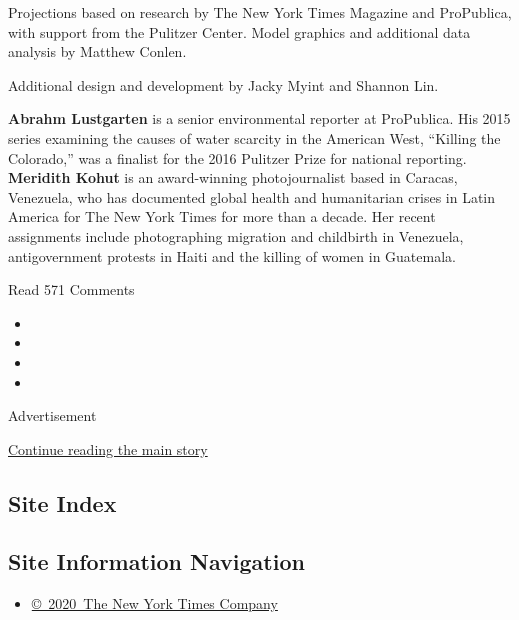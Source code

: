 Projections based on research by The New York Times Magazine and
ProPublica, with support from the Pulitzer Center. Model graphics and
additional data analysis by Matthew Conlen.

Additional design and development by Jacky Myint and Shannon Lin.

\textbf{Abrahm Lustgarten} is a senior environmental reporter at
ProPublica. His 2015 series examining the causes of water scarcity in
the American West, ``Killing the Colorado,'' was a finalist for the 2016
Pulitzer Prize for national reporting. \textbf{Meridith Kohut} is an
award-winning photojournalist based in Caracas, Venezuela, who has
documented global health and humanitarian crises in Latin America for
The New York Times for more than a decade. Her recent assignments
include photographing migration and childbirth in Venezuela,
antigovernment protests in Haiti and the killing of women in Guatemala.

Read 571 Comments

\begin{itemize}
\item
\item
\item
\item
\end{itemize}

Advertisement

\protect\hyperlink{after-bottom}{Continue reading the main story}

\hypertarget{site-index}{%
\subsection{Site Index}\label{site-index}}

\hypertarget{site-information-navigation}{%
\subsection{Site Information
Navigation}\label{site-information-navigation}}

\begin{itemize}
\tightlist
\item
  \href{https://help.nytimes.com/hc/en-us/articles/115014792127-Copyright-notice}{©~2020~The
  New York Times Company}
\end{itemize}

